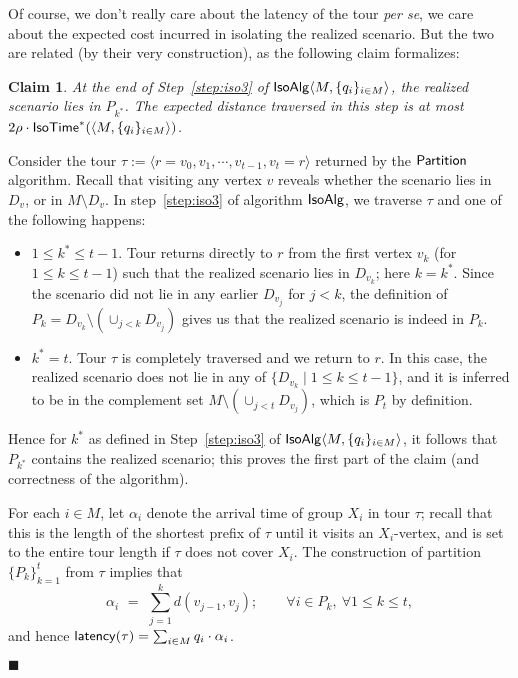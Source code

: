 \documentclass[11pt]{article}
\newtheorem{claim}[thm]{Claim}
\def\iso{\ensuremath{{\sf IsoAlg}}\xspace}
\def\palg{\ensuremath{{\sf Partition}}\xspace}
\def\latency{{\sf latency}}
\def\isotime{\ensuremath{{\sf IsoTime}}}
\def\isoopt{{\isotime}^*}
\def\ts{\textstyle}
\newenvironment{pf}{

\noindent{\bf Proof:}} {\hfill$\blacksquare$


}
\begin{document}
Of course, we don't really care about the latency of the tour \emph{per se}, we care about the expected cost incurred in
isolating the realized scenario. But the two are related (by their very construction), as the following claim
formalizes:

\begin{claim}\label{cl:alg2}
  At the end of Step~\ref{step:iso3} of $\iso\langle M, \{q_i\}_{i\in
    M}\rangle$, the realized scenario lies in $P_{k^*}$. The expected
  distance traversed in this step is at most $2\rho\cdot \isoopt(\langle M, \{q_i\}_{i\in M}\rangle)$.
\end{claim}
\begin{pf}
  Consider the tour $\tau:= \langle r =v_0,v_1,\cdots,v_{t-1},v_t=r\rangle$ returned by
  the \palg algorithm. Recall that visiting any vertex $v$ reveals whether the
  scenario lies in $D_{v}$, or in $M\setminus D_{v}$. In step~\ref{step:iso3} of algorithm \iso,
  we traverse $\tau$ and one of the following happens:
\begin{itemize}
   \item $1\le k^*\le t-1$. Tour returns directly to $r$ from the first vertex $v_k$ (for $1\le
  k\le t-1$) such that the realized scenario lies in $D_{v_k}$; here $k=k^*$. Since the scenario did not lie in any earlier $D_{v_j}$ for $j <  k$, the definition of $P_k = D_{v_k} \setminus (\cup_{j < k} D_{v_j})$
  gives us that the realized scenario is indeed in $P_k$.
  \item $k^*=t$. Tour $\tau$ is completely traversed and we return to $r$. In this case, the
  realized scenario does not lie in any of $\{D_{v_k}\mid 1\le k\le
  t-1\}$, and  it is inferred to be in the complement set $M\setminus (\cup_{j<t} D_{v_j})$,
  which is $P_t$ by definition.
\end{itemize}
Hence for $k^*$ as defined in  Step~\ref{step:iso3} of $\iso\langle M, \{q_i\}_{i\in M}\rangle$, it follows that
$P_{k^*}$ contains the realized scenario; this proves the first part of the claim (and correctness of the algorithm).

For each $i\in M$, let $\alpha_i$ denote the arrival time of group $X_i$ in tour $\tau$; recall that this is the
length of the shortest prefix of $\tau$ until it visits an $X_i$-vertex, and is set to the entire tour length if $\tau$
does not cover $X_i$. The construction of partition $\{P_k\}_{k=1}^t$ from $\tau$ implies that
  \begin{equation*}
    \label{eq:4}
    \ts \alpha_i \,\, = \,\, \sum_{j=1}^k d(v_{j-1},v_j); \qquad \forall i\in
    P_k,~\forall 1\le k\le t,
  \end{equation*}
and hence $\latency(\tau) =\sum_{i\in M} q_i\cdot \alpha_i$.


\end{pf}
\end{document}
